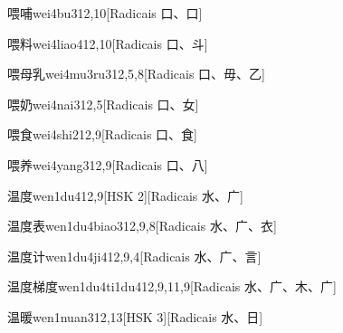 \begin{entry}{喂哺}{wei4bu3}{12,10}[Radicais ⼝、⼝]
\end{entry}

\begin{entry}{喂料}{wei4liao4}{12,10}[Radicais ⼝、⽃]
\end{entry}

\begin{entry}{喂母乳}{wei4mu3ru3}{12,5,8}[Radicais ⼝、⽏、⼄]
\end{entry}

\begin{entry}{喂奶}{wei4nai3}{12,5}[Radicais ⼝、⼥]
\end{entry}

\begin{entry}{喂食}{wei4shi2}{12,9}[Radicais ⼝、⾷]
\end{entry}

\begin{entry}{喂养}{wei4yang3}{12,9}[Radicais ⼝、⼋]
\end{entry}

\begin{entry}{温度}{wen1du4}{12,9}[HSK 2][Radicais ⽔、⼴]
\end{entry}

\begin{entry}{温度表}{wen1du4biao3}{12,9,8}[Radicais ⽔、⼴、⾐]
\end{entry}

\begin{entry}{温度计}{wen1du4ji4}{12,9,4}[Radicais ⽔、⼴、⾔]
\end{entry}

\begin{entry}{温度梯度}{wen1du4ti1du4}{12,9,11,9}[Radicais ⽔、⼴、⽊、⼴]
\end{entry}

\begin{entry}{温暖}{wen1nuan3}{12,13}[HSK 3][Radicais ⽔、⽇]
\end{entry}

